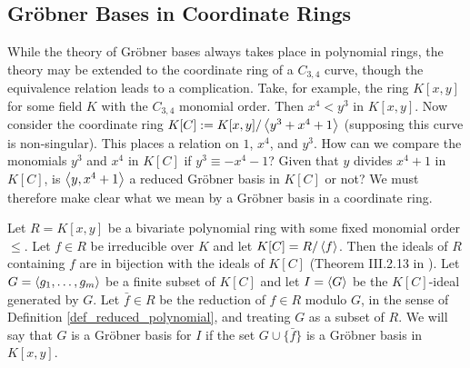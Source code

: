 \subsection{Gr\"obner Bases in Coordinate Rings}
\label{sec_groebner_bases_in_coordinate_rings}

While the theory of Gr\"obner bases always takes place in polynomial rings,
the theory may be extended to the coordinate ring of a $C_{3,4}$ curve,
though the equivalence relation leads to a complication.
Take, for example, the ring $K[x,y]$ for some field $K$ with the $C_{3,4}$ monomial order.
Then $x^4 < y^3$ in $K[x,y]$.
Now consider the coordinate ring $K[C] := K[x,y]/\left\langle y^3 + x^4 + 1 \right\rangle$
(supposing this curve is non-singular).
This places a relation on $1$, $x^4$, and $y^3$.
How can we compare the monomials $y^3$ and $x^4$ in $K[C]$ if $y^3 \equiv -x^4 - 1$?
Given that $y$ divides $x^4 + 1$ in $K[C]$, is $\left\langle y, x^4 + 1 \right\rangle$ a reduced Gr\"obner basis in $K[C]$ or not?
We must therefore make clear what we mean by a Gr\"obner basis in a coordinate ring.

Let $R = K[x,y]$ be a bivariate polynomial ring with some fixed monomial order $\leq$.
Let $f \in R$ be irreducible over $K$ and let $K[C] = R/\left\langle f \right\rangle$.
Then the ideals of $R$ containing $f$ are in bijection with the ideals of $K[C]$
(Theorem III.2.13 in \cite{hungerford}).
Let $G = \left\langle g_1, \ldots, g_m \right\rangle$ be a finite subset of $K[C]$
and let $I = \left\langle G \right\rangle$ be the $K[C]$-ideal generated by $G$.
Let $\bar f \in R$ be the reduction of $f \in R$ modulo $G$, in the sense of Definition \ref{def_reduced_polynomial},
and treating $G$ as a subset of $R$.
We will say that $G$ is a Gr\"obner basis for $I$ if the set $G \cup \{ \bar f \}$ is a Gr\"obner basis in $K[x,y]$.

